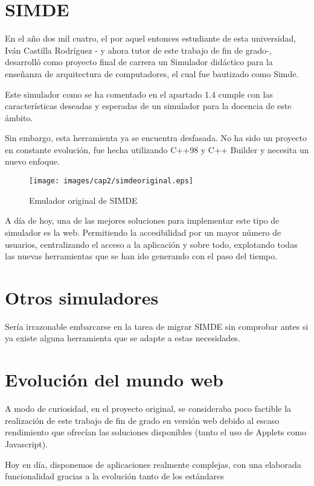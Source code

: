 

\section{SIMDE}
\label{2:sec1}

En el año dos mil cuatro, el por aquel entonces estudiante de esta universidad, 
Iván Castilla Rodríguez - y ahora tutor de este trabajo de fin de grado-, 
desarrolló como proyecto final de carrera un Simulador didáctico para la enseñanza 
de arquitectura de computadores, el cual fue bautizado como Simde. 

\bigskip
Este simulador como se ha comentado en el apartado 1.4 cumple con las características
deseadas y esperadas de un simulador para la docencia de este ámbito.

\bigskip
Sin embargo, esta herramienta ya se encuentra desfasada. No ha sido un proyecto en constante
evolución, fue hecha utilizando C++98 y C++ Builder y necesita un nuevo enfoque.

\begin{figure}[!th]
\begin{center}
\texttt{[image: images/cap2/simdeoriginal.eps]}
\caption{Emulador original de SIMDE}
\label{fig:Emulador original de SIMDE}
\end{center}
\end{figure}

A día de hoy, una de las mejores soluciones para implementar este tipo de simulador es la web.
Permitiendo la accesibilidad por un mayor número de usuarios, centralizando el acceso a la 
aplicación y sobre todo, explotando todas las nuevas herramientas que se han ido generando
con el paso del tiempo.

\section{Otros simuladores}
\label{2:sec2}

Sería irrazonable embarcarse en la tarea de migrar SIMDE sin comprobar antes si ya existe alguna
herramienta que se adapte a estas necesidades.

\section{Evolución del mundo web}
\label{2:sec3}

A modo de curiosidad, en el proyecto original, se consideraba poco factible la realización de 
este trabajo de fin de grado en versión web debido al escaso rendimiento que ofrecían las 
soluciones disponibles (tanto el uso de Applets como Javascript).

\bigskip
Hoy en día, disponemos de aplicaciones realmente complejas, con una elaborada funcionalidad 
gracias a la evolución tanto de los estándares 

